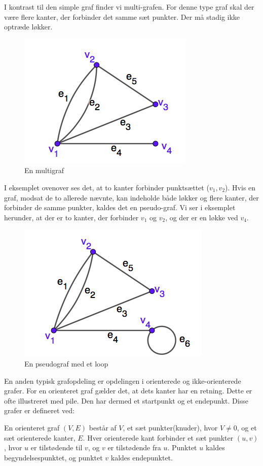 I kontrast til den simple graf finder vi multi-grafen. For denne type graf skal der være flere kanter, der forbinder det samme sæt punkter. Der må stadig ikke optræde løkker.
\begin{figure}[H]
\centering
\includegraphics[scale=0.5]{fig/img/multigraf.png} 
\caption{En multigraf}
\label{fig:multi}
\end{figure}
I eksemplet ovenover ses det, at to kanter forbinder punktsættet ($v_{1},v_{2}$). Hvis en graf, modsat de to allerede nævnte, kan indeholde både løkker og flere kanter, der forbinder de samme punkter, kaldes det en pseudo-graf. Vi ser i eksemplet herunder, at der er to kanter, der forbinder $v_{1}$ og $v_{2}$, og der er en løkke ved $v_{4}$.
\begin{figure}[H]
\centering
\includegraphics[scale=0.5]{fig/img/pseudograf.png}
\caption{En pseudograf med et loop}
\label{fig:pseudo}
\end{figure}
En anden typisk grafopdeling er opdelingen i orienterede og ikke-orienterede grafer. For en orienteret graf gælder det, at dets kanter har en retning. Dette er ofte illustreret med pile. Den har dermed et startpunkt og et endepunkt. Disse grafer er defineret ved:
\begin{definition}
En orienteret graf $(V,E)$ består af $V$, et sæt punkter(knuder), hvor $V\neq0$, og et sæt orienterede kanter, $E$. Hver orienterede kant forbinder et sæt punkter $(u,v)$, hvor $u$ er tilstødende til $v$, og $v$ er tilstødende fra $u$. Punktet $u$ kaldes begyndelsespunktet, og punktet $v$ kaldes endepunktet.
\end{definition}
